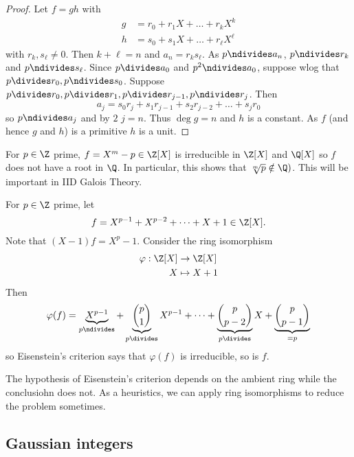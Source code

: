 \documentclass[a4paper]{article}
\theoremstyle{definition}
\begin{document}
\begin{proof}
  Let \(f = gh\) with
  \begin{align*}
    g &= r_0 + r_1X + \dots + r_kX^k \\
    h &= s_0 + s_1X + \dots + r_\ell X^\ell
  \end{align*}
  with \(r_k, s_\ell \neq 0\). Then \(k + \ell = n\) and \(a_n = r_ks_\ell\). As \(p \ndivides a_n\), \(p \ndivides r_k\) and \(p \ndivides s_\ell\). Since \(p \divides a_0\) and \(p^2 \ndivides a_0\), suppose wlog that \(p \divides r_0, p \ndivides s_0\). Suppose \(p \divides r_0, p \divides r_1, p \divides r_{j - 1}, p \ndivides r_j\). Then
  \[
    a_j = s_0r_j + s_1r_{j - 1} + s_2r_{j - 2} + \dots + s_j r_0
  \]
  so \(p \ndivides a_j\) and by \(2\) \(j = n\). Thus \(\deg g = n\) and \(h\) is a constant. As \(f\) (and hence \(g\) and \(h\)) is a primitive \(h\) is a unit.
\end{proof}

\begin{eg}
  For \(p \in \Z\) prime, \(f = X^m - p \in \Z[X]\) is irreducible in \(\Z[X]\) and \(\Q[X]\) so \(f\) does not have a root in \(\Q\). In particular, this shows that \(\sqrt[m]{p} \notin \Q)\). This will be important in IID Galois Theory.
\end{eg}

\begin{eg}
  For \(p \in \Z\) prime, let
  \[
    f = X^{p - 1} + X^{p - 2} + \dots + X + 1 \in \Z[X].
  \]
  Note that \((X - 1)f = X^p - 1\). Consider the ring isomorphism
  \begin{align*}
    \varphi: \Z[X] &\to \Z[X] \\
    X &\mapsto X + 1
  \end{align*}
  Then
  \[
    \varphi(f) = \underbrace{X^{p - 1}}_{p \ndivides} + \underbrace{\binom{p}{1}}_{p \divides} X^{p - 1} + \dots + \underbrace{\binom{p}{p - 2}}_{p \divides} X + \underbrace{\binom{p}{p - 1}}_{= p}
  \]
  so Eisenstein's criterion says that \(\varphi(f)\) is irreducible, so is \(f\).
\end{eg}

\begin{remark}
  The hypothesis of Eisenstein's criterion depends on the ambient ring while the conclusiohn does not. As a heuristics, we can apply ring isomorphisms to reduce the problem sometimes.
\end{remark}

\subsection{Gaussian integers}
\end{document}
